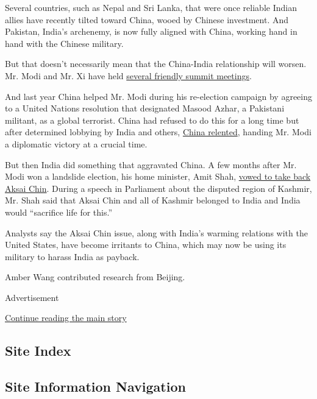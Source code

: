 Several countries, such as Nepal and Sri Lanka, that were once reliable
Indian allies have recently tilted toward China, wooed by Chinese
investment. And Pakistan, India's archenemy, is now fully aligned with
China, working hand in hand with the Chinese military.

But that doesn't necessarily mean that the China-India relationship will
worsen. Mr. Modi and Mr. Xi have held
\href{https://www.nytimes3xbfgragh.onion/2019/10/11/world/asia/narendra-modi-xi-jinping-india-china.html}{several
friendly summit meetings}.

And last year China helped Mr. Modi during his re-election campaign by
agreeing to a United Nations resolution that designated Masood Azhar, a
Pakistani militant, as a global terrorist. China had refused to do this
for a long time but after determined lobbying by India and others,
\href{https://www.lowyinstitute.org/the-interpreter/masood-azhar-global-terrorist-and-implications-pakistan}{China
relented}, handing Mr. Modi a diplomatic victory at a crucial time.

But then India did something that aggravated China. A few months after
Mr. Modi won a landslide election, his home minister, Amit Shah,
\href{https://economictimes.indiatimes.com/news/politics-and-nation/pok-aksai-chin-part-of-jammu-and-kashmir-will-sacrifice-our-lives-for-it-amit-shah-in-lok-sabha/videoshow/70550153.cms?from=mdr}{vowed
to take back Aksai Chin}. During a speech in Parliament about the
disputed region of Kashmir, Mr. Shah said that Aksai Chin and all of
Kashmir belonged to India and India would ``sacrifice life for this.''

Analysts say the Aksai Chin issue, along with India's warming relations
with the United States, have become irritants to China, which may now be
using its military to harass India as payback.

Amber Wang contributed research from Beijing.

Advertisement

\protect\hyperlink{after-bottom}{Continue reading the main story}

\hypertarget{site-index}{%
\subsection{Site Index}\label{site-index}}

\hypertarget{site-information-navigation}{%
\subsection{Site Information
Navigation}\label{site-information-navigation}}

